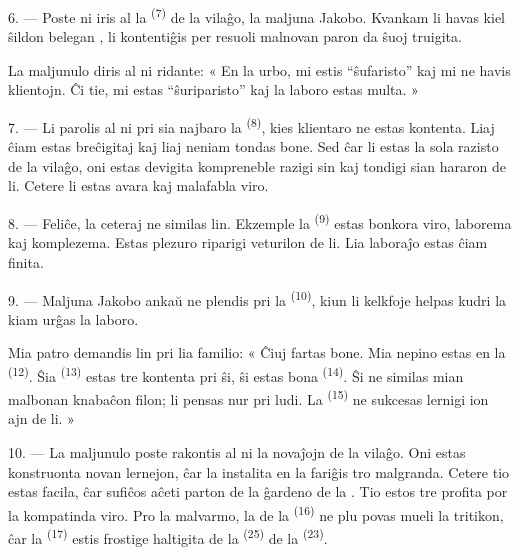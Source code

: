 6. --- Poste ni iris al la  \textsuperscript{(7)} de la vilaĝo,
la maljuna Jakobo. Kvankam li havas kiel ŝildon belegan , li
kontentiĝis per resuoli malnovan paron da ŝuoj truigita.

La maljunulo diris al ni ridante: « En la urbo, mi estis “ŝufaristo” kaj mi
ne havis klientojn. Ĉi tie, mi estas “ŝuriparisto” kaj la laboro estas multa. »

7. --- Li parolis al ni pri sia najbaro la 
\textsuperscript{(8)}, kies klientaro ne estas kontenta. Liaj 
ĉiam estas breĉigitaj kaj liaj  neniam tondas bone. Sed ĉar li
estas la sola razisto de la vilaĝo, oni estas devigita kompreneble razigi sin
kaj tondigi sian hararon de li. Cetere li estas avara kaj malafabla viro.

8. --- Feliĉe, la ceteraj  ne similas lin. Ekzemple la
 \textsuperscript{(9)} estas bonkora viro, laborema kaj
komplezema. Estas plezuro riparigi veturilon de li. Lia laboraĵo estas ĉiam
finita.

9. --- Maljuna Jakobo ankaŭ ne plendis pri la 
\textsuperscript{(10)}, kiun li kelkfoje helpas kudri la 
kiam urĝas la laboro.

Mia patro demandis lin pri lia familio: « Ĉiuj fartas bone. Mia nepino estas
en la  \textsuperscript{(12)}. Ŝia 
\textsuperscript{(13)} estas tre kontenta pri ŝi, ŝi estas bona
 \textsuperscript{(14)}. Ŝi ne similas mian malbonan
knabaĉon filon; li pensas nur pri ludi. La 
\textsuperscript{(15)} ne sukcesas lernigi ion ajn de li. »

\VUsaut{3.0mm}
\VUsaut{3.0mm}

10. --- La maljunulo poste rakontis al ni la novaĵojn de la vilaĝo. Oni estas
konstruonta novan lernejon, ĉar la instalita en la 
fariĝis tro malgranda. Cetere tio estas facila, ĉar sufiĉos aĉeti parton de la
ĝardeno de la . Tio estos tre profita por la kompatinda viro.
Pro la malvarmo, la  de la 
\textsuperscript{(16)} ne plu povas mueli la tritikon, ĉar la 
\textsuperscript{(17)} estis frostige haltigita de la 
\textsuperscript{(25)} de la  \textsuperscript{(23)}.

